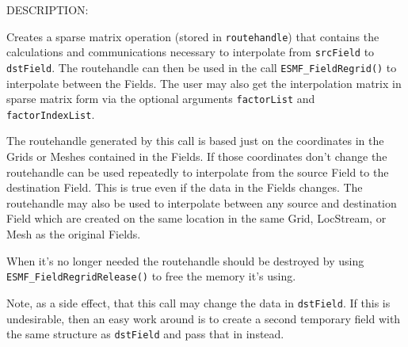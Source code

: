 {\sf DESCRIPTION:\\ }


         \begin{sloppypar}
         Creates a sparse matrix operation (stored in {\tt routehandle}) that 
         contains the calculations and communications necessary to interpolate
         from {\tt srcField} to {\tt dstField}. The routehandle can then be 
         used in the call {\tt ESMF\_FieldRegrid()} to interpolate between the
         Fields. The user may also get the interpolation matrix in sparse 
         matrix form via the optional arguments {\tt factorList} and {\tt factorIndexList}. 
         \end{sloppypar}
         
         The routehandle generated by this call is based just on the 
         coordinates in the Grids or Meshes contained in the Fields.  If those
         coordinates don't change the routehandle can
         be used repeatedly to interpolate from the source Field to the 
         destination Field.  This is true even if the data in the Fields 
         changes. The routehandle may also be used to interpolate between any
         source and destination Field which are created on the same location 
         in the same Grid, LocStream, or Mesh as the original Fields.        
  
         When it's no longer needed the routehandle should be destroyed by 
         using {\tt ESMF\_FieldRegridRelease()} to free the memory it's using. 
  
         Note, as a side effect, that this call may change the data in {\tt dstField}. If
         this is undesirable, then an easy work around is to create a second temporary field
         with the same structure as {\tt dstField} and pass that in instead. 
  
